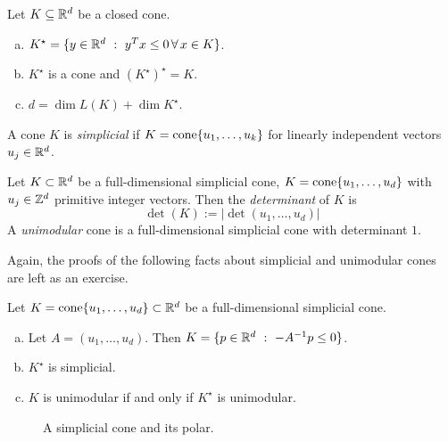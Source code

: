 \begin{lemma}
  Let $K \subseteq \mathbb{R}^d$ be a closed cone.
  \begin{enumerate}[(a)]
    \item $K^\star = \{ y \in \mathbb{R}^d ~:~ y^Tx \leq 0 \,\forall\, x\in K \}$.
    \item $K^\star$ is a cone and $(K^\star)^\star = K$.
    \item $d = \dim L(K) + \dim K^\star$.
  \end{enumerate}
\end{lemma}

\begin{definition}
  A cone $K$ is \emph{simplicial} if $K = \operatorname{cone}\{ u_1, \ldots, u_k \}$ for linearly independent vectors $u_j \in \mathbb{R}^d$.
\end{definition}

\begin{definition}
  Let $K \subset \mathbb{R}^d$ be a full-dimensional simplicial cone,
  $K = \operatorname{cone}\{ u_1, \ldots, u_d \}$
  with $u_j \in \mathbb{Z}^d$ primitive integer vectors.
  Then the \emph{determinant} of $K$ is
  \[
    \det(K) := |\det(u_1,\ldots,u_d)|
  \]
  A \emph{unimodular} cone is a full-dimensional simplicial cone with determinant $1$.
\end{definition}

Again, the proofs of the following facts about simplicial and unimodular cones are left as an exercise.

\begin{lemma}
  Let $K = \operatorname{cone}\{u_1,\ldots,u_d\} \subset \mathbb{R}^d$ be a full-dimensional simplicial cone.
  \begin{enumerate}[(a)]
    \item Let $A = (u_1, \ldots, u_d)$. Then $K = \{ p \in \mathbb{R}^d ~:~ -A^{-1} p \leq 0 \}$.
    \item $K^\star$ is simplicial.
    \item $K$ is unimodular if and only if $K^\star$ is unimodular.
  \end{enumerate}
\end{lemma}

\begin{figure}
  \begin{center}
  \end{center}
  \caption{A simplicial cone and its polar.}
\end{figure}


